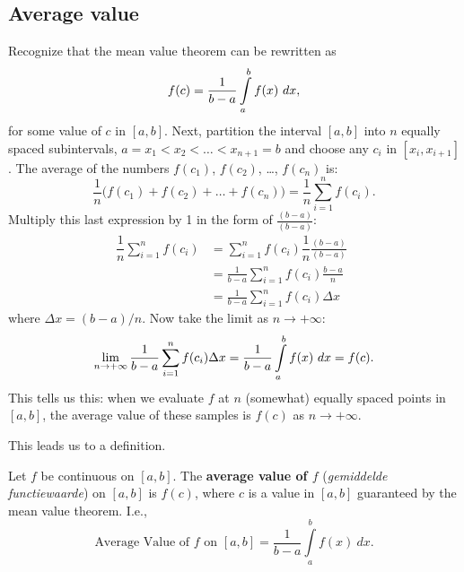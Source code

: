 \subsection{Average value}
\ifcourse
	\checkoddpage
{}
 \fi
Recognize that the mean value theorem can be rewritten as 
$$f(c) = \frac{1}{b-a}\ds \int\limits_a^b f(x)\ dx,$$
 for some value of $c$ in $[a,b]$. Next, partition the interval $[a,b]$ into $n$ equally spaced subintervals, $a=x_1 < x_2 < \ldots < x_{n+1}=b$ and choose any $c_i$ in $[x_i,x_{i+1}]$. The average of the numbers $f(c_1)$, $f(c_2)$, \ldots, $f(c_n)$ is:
	$$\dfrac{1}{n}\Big(f(c_1) + f(c_2) + \ldots + f(c_n)\Big) = \dfrac{1}{n}\sum_{i=1}^n f(c_i).$$ Multiply this last expression by 1 in the form of $\frac{(b-a)}{(b-a)}$:
	\begin{align*}
	\dfrac{1}{n}\sum_{i=1}^n f(c_i) &= \sum_{i=1}^n f(c_i)\dfrac{1}{n} \frac{(b-a)}{(b-a)} \\[0.2cm]
									&= \frac{1}{b-a} \sum_{i=1}^n f(c_i)\frac{b-a}n  \\[0.2cm]
									&=\frac{1}{b-a} \sum_{i=1}^n f(c_i)\Delta x\quad  %
	\end{align*}
where $\Delta x = (b-a)/n$. Now take the limit as $n\to+\infty$:
		$$\lim_{n\to+\infty} \frac{1}{b-a} \displaystyle\sum_{i=1}^n f(c_i)\Delta x =  \frac{1}{b-a} \displaystyle \int\limits_a^b f(x)\ dx =   f(c).$$
This tells us this: when we evaluate $f$ at $n$ (somewhat) equally spaced points in $[a,b]$, the average value of these samples is $f(c)$ as $n\to+\infty$.

This leads us to a definition.

\begin{definition} \label{def:av_val}
Let $f$ be continuous on $[a,b]$. The \textbf{average value of $f$} (\textit{gemiddelde functiewaarde}) on $[a,b]$ is $f(c)$, where $c$ is a value in $[a,b]$ guaranteed by the mean value theorem. I.e., 
$$\text{Average Value of $f$ on $[a,b]$} = \frac{1}{b-a}\int\limits_a^bf(x)\ dx.$$

\end{definition}

